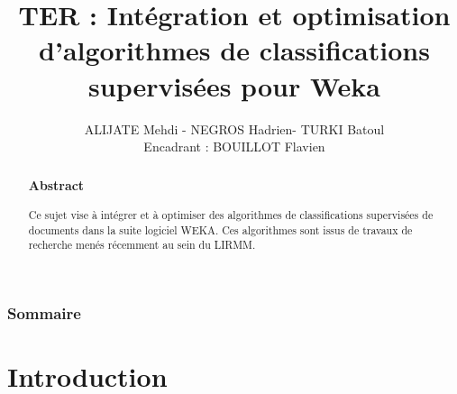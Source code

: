 \documentclass[12pt]{beamer}
\author{ALIJATE Mehdi -  NEGROS Hadrien- TURKI Batoul\\
Encadrant : BOUILLOT Flavien}
\title{TER :  Intégration et optimisation d’algorithmes de classifications supervisées pour Weka
}
\institute{Université Montpellier 2 - LIRMM}
\begin{document}
\begin{frame}
\titlepage 
\end{frame}



\begin{frame}
\begin{abstract}

\frametitle{Abstract}
\begin{center}
Ce sujet vise à intégrer et à optimiser des algorithmes de classifications supervisées de documents dans la suite logiciel WEKA. Ces algorithmes sont issus de travaux de recherche menés récemment au sein du LIRMM.
\end{center}
\end{abstract}
\end{frame}

\begin{frame}
\tableofcontents
\frametitle{Sommaire}


\end{frame}


\section{Introduction}
\end{document}
